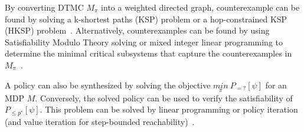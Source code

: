 By converting DTMC $M_\pi$ into a weighted directed graph, counterexample can be found by solving a k-shortest paths (KSP) problem or 
a hop-constrained KSP (HKSP) problem~\cite{4770111}. 
Alternatively, counterexamples can be found by using Satisfiability Modulo Theory solving or mixed integer linear programming to 
determine the minimal critical subsystems that capture the counterexamples in $M_\pi$~\cite{Wimmer2012}. 

A policy can also be synthesized by solving the objective $\underset{\pi}{min}\ P_{=?}[\psi]$ for an MDP $M$. Conversely, the solved policy can be used to verify the satisfiability of $P_{\leq p^*}[\psi]$. 
This problem can be solved by linear programming or policy iteration (and value iteration for step-bounded reachability)~\cite{Kwiatkowska2013}.




